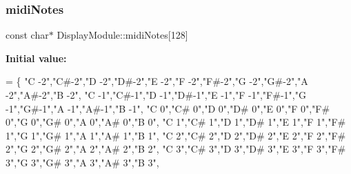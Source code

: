 \subsubsection{\texorpdfstring{midi\+Notes}{midiNotes}}
{\footnotesize\ttfamily const char$\ast$ Display\+Module\+::midi\+Notes\mbox{[}128\mbox{]}\hspace{0.3cm}{\ttfamily [private]}}

{\bfseries Initial value\+:}
\begin{DoxyCode}
= \{
    \textcolor{stringliteral}{"C -2"},\textcolor{stringliteral}{"C#-2"},\textcolor{stringliteral}{"D -2"},\textcolor{stringliteral}{"D#-2"},\textcolor{stringliteral}{"E -2"},\textcolor{stringliteral}{"F -2"},\textcolor{stringliteral}{"F#-2"},\textcolor{stringliteral}{"G -2"},\textcolor{stringliteral}{"G#-2"},\textcolor{stringliteral}{"A -2"},\textcolor{stringliteral}{"A#-2"},\textcolor{stringliteral}{"B -2"},
    \textcolor{stringliteral}{"C -1"},\textcolor{stringliteral}{"C#-1"},\textcolor{stringliteral}{"D -1"},\textcolor{stringliteral}{"D#-1"},\textcolor{stringliteral}{"E -1"},\textcolor{stringliteral}{"F -1"},\textcolor{stringliteral}{"F#-1"},\textcolor{stringliteral}{"G -1"},\textcolor{stringliteral}{"G#-1"},\textcolor{stringliteral}{"A -1"},\textcolor{stringliteral}{"A#-1"},\textcolor{stringliteral}{"B -1"},
    \textcolor{stringliteral}{"C  0"},\textcolor{stringliteral}{"C# 0"},\textcolor{stringliteral}{"D  0"},\textcolor{stringliteral}{"D# 0"},\textcolor{stringliteral}{"E  0"},\textcolor{stringliteral}{"F  0"},\textcolor{stringliteral}{"F# 0"},\textcolor{stringliteral}{"G  0"},\textcolor{stringliteral}{"G# 0"},\textcolor{stringliteral}{"A  0"},\textcolor{stringliteral}{"A# 0"},\textcolor{stringliteral}{"B  0"},
    \textcolor{stringliteral}{"C  1"},\textcolor{stringliteral}{"C# 1"},\textcolor{stringliteral}{"D  1"},\textcolor{stringliteral}{"D# 1"},\textcolor{stringliteral}{"E  1"},\textcolor{stringliteral}{"F  1"},\textcolor{stringliteral}{"F# 1"},\textcolor{stringliteral}{"G  1"},\textcolor{stringliteral}{"G# 1"},\textcolor{stringliteral}{"A  1"},\textcolor{stringliteral}{"A# 1"},\textcolor{stringliteral}{"B  1"},
    \textcolor{stringliteral}{"C  2"},\textcolor{stringliteral}{"C# 2"},\textcolor{stringliteral}{"D  2"},\textcolor{stringliteral}{"D# 2"},\textcolor{stringliteral}{"E  2"},\textcolor{stringliteral}{"F  2"},\textcolor{stringliteral}{"F# 2"},\textcolor{stringliteral}{"G  2"},\textcolor{stringliteral}{"G# 2"},\textcolor{stringliteral}{"A  2"},\textcolor{stringliteral}{"A# 2"},\textcolor{stringliteral}{"B  2"},
    \textcolor{stringliteral}{"C  3"},\textcolor{stringliteral}{"C# 3"},\textcolor{stringliteral}{"D  3"},\textcolor{stringliteral}{"D# 3"},\textcolor{stringliteral}{"E  3"},\textcolor{stringliteral}{"F  3"},\textcolor{stringliteral}{"F# 3"},\textcolor{stringliteral}{"G  3"},\textcolor{stringliteral}{"G# 3"},\textcolor{stringliteral}{"A  3"},\textcolor{stringliteral}{"A# 3"},\textcolor{stringliteral}{"B  3"},

\end{DoxyCode}
